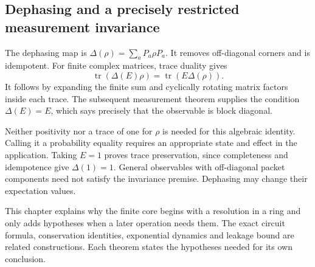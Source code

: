 
\subsection{Dephasing and a precisely restricted measurement invariance}
The dephasing map is $\Delta(\rho)=\sum_aP_a\rho P_a$. It removes off-diagonal corners and is idempotent. For finite complex matrices, trace duality gives
\[
\operatorname{tr}(\Delta(E)\rho)=\operatorname{tr}(E\Delta(\rho)).
\]
It follows by expanding the finite sum and cyclically rotating matrix factors inside each trace. The subsequent measurement theorem supplies the condition $\Delta(E)=E$, which says precisely that the observable is block diagonal.


Neither positivity nor a trace of one for $\rho$ is needed for this algebraic identity. Calling it a probability equality requires an appropriate state and effect in the application. Taking $E=1$ proves trace preservation, since completeness and idempotence give $\Delta(1)=1$. General observables with off-diagonal packet components need not satisfy the invariance premise. Dephasing may change their expectation values.

This chapter explains why the finite core begins with a resolution in a ring and only adds hypotheses when a later operation needs them. The exact circuit formula, conservation identities, exponential dynamics and leakage bound are related constructions. Each theorem states the hypotheses needed for its own conclusion.
